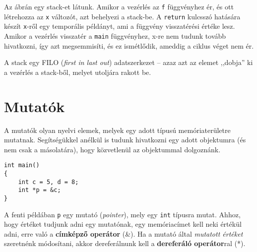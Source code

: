 \documentclass[a4paper,11.5pt,table]{article}
\begin{document}
	\begin{figure}[!h]
		\centering
	\end{figure}
	Az ábrán egy stack-et látunk. Amikor a vezérlés az \texttt{f} függvényhez ér, és ott létrehozza az \texttt{x} változót, azt behelyezi a stack-be. A \texttt{return} kulcsszó hatására készít \texttt{x}-ről egy temporális példányt, ami a függvény visszatérési értéke lesz. Amikor a vezérlés visszatér a \texttt{main} függvényhez, {x}-re nem tudunk tovább hivatkozni, így azt megsemmisíti, és ez ismétlődik, ameddig a ciklus véget nem ér.
	\smallskip
	
	A stack egy FILO (\textit{first in last out}) adatszerkezet -- azaz azt az elemet ,,dobja'' ki a vezérlés a stack-ből, melyet utoljára rakott be.
	\section{Mutatók}
	A mutatók olyan nyelvi elemek, melyek egy adott típusú memóriaterületre mutatnak. Segítségükkel anélkül is tudunk hivatkozni egy adott objektumra (és nem csak a másolatára), hogy közvetlenül az objektummal dolgoznánk.
	\begin{lstlisting}
int main()
{
	int c = 5, d = 8;
	int *p = &c;
}
	\end{lstlisting}
	A fenti példában \texttt{p} egy mutató (\textit{pointer}), mely egy \texttt{int} típusra mutat. Ahhoz, hogy értéket tudjunk adni egy mutatónak, egy memóriacímet kell neki értékül adni, erre való a \textbf{címképző operátor} (\&). Ha a mutató által \textit{mutatott értéket} szeretnénk módosítani, akkor dereferálnunk kell a \textbf{dereferáló operátor}ral (*).
	
\end{document}
